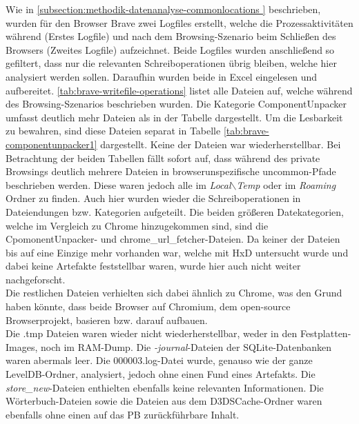 \begin{appendices}
Wie in \ref{subsection:methodik-datenanalyse-commonlocations	} beschrieben, wurden für den Browser Brave zwei Logfiles erstellt, welche die Prozessaktivitäten während (Erstes Logfile) und nach dem Browsing-Szenario beim Schließen des Browsers (Zweites Logfile) aufzeichnet. Beide Logfiles wurden anschließend so gefiltert, dass nur die relevanten Schreiboperationen übrig bleiben, welche hier analysiert werden sollen. Daraufhin wurden beide in Excel eingelesen und aufbereitet. \autoref{tab:brave-writefile-operations} listet alle Dateien auf, welche während des Browsing-Szenarios beschrieben wurden. Die Kategorie \glqq{}ComponentUnpacker\grqq{} umfasst deutlich mehr Dateien als in der Tabelle dargestellt. Um die Lesbarkeit zu bewahren, sind diese Dateien separat in Tabelle \ref{tab:brave-componentunpacker1} dargestellt. Keine der Dateien war wiederherstellbar.
Bei Betrachtung der beiden Tabellen fällt sofort auf, dass während des private Browsings deutlich mehrere Dateien in browserunspezifische \glqq{}uncommon\grqq{}-Pfade beschrieben werden. Diese waren jedoch alle im \textit{Local$\backslash$Temp} oder im \textit{Roaming} Ordner zu finden. Auch hier wurden wieder die Schreiboperationen in Dateiendungen bzw. Kategorien aufgeteilt. Die beiden größeren Datekategorien, welche im Vergleich zu Chrome hinzugekommen sind, sind die \glqq{}CpomonentUnpacker\grqq{}- und \glqq{}chrome\_url\_fetcher\grqq{}-Dateien. Da keiner der Dateien bis auf eine Einzige mehr vorhanden war, welche mit HxD untersucht wurde und dabei keine Artefakte feststellbar waren, wurde hier auch nicht weiter nachgeforscht. \\
Die restlichen Dateien verhielten sich dabei ähnlich zu Chrome, was den Grund haben könnte, dass beide Browser auf Chromium, dem open-source Browserprojekt, basieren bzw. darauf aufbauen. \\
Die .tmp Dateien waren wieder nicht wiederherstellbar, weder in den Festplatten-Images, noch im RAM-Dump. Die \textit{-journal}-Dateien der SQLite-Datenbanken waren abermals leer. Die 000003.log-Datei wurde, genauso wie der ganze LevelDB-Ordner, analysiert, jedoch ohne einen Fund eines Artefakts. Die \textit{store\_new}-Dateien enthielten ebenfalls keine relevanten Informationen. Die Wörterbuch-Dateien sowie die Dateien aus dem \glqq{}D3DSCache\grqq{}-Ordner waren ebenfalls ohne einen auf das PB zurückführbare Inhalt.


\end{appendices}
